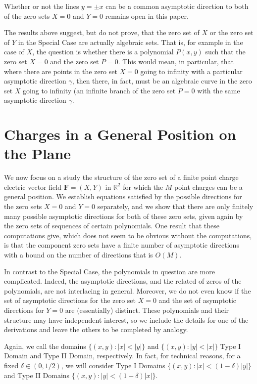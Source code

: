 \documentclass{article}
\theoremstyle{remark}
\numberwithin{equation}{section}
\begin{document}
Whether or not the lines $y = \pm x$ can be a common asymptotic direction to both of the zero sets 
$X=0$ and $Y=0$ remains open in this paper.   

The results above suggest, but do not prove, that the zero set of $X$ or the zero set of $Y$ in the Special Case are actually algebraic sets. That is, for example in the case of $X$, 
the question is whether there is a polynomial $P(x,y)$ such that the zero set $X=0$ and the zero set $P=0$.  This would mean, in particular, that where there are points in 
the zero set $X=0$ going to infinity with a particular asymptotic direction $\gamma$, then there, in fact, must be an algebraic curve in the zero set $X$ going to infinity 
(an infinite branch of the zero set $P=0$ with the same asymptotic direction $\gamma$.

\section{Charges in a General Position on the Plane}\label{GENERAL}

We now focus on a study the structure of the zero set of a finite point charge electric vector field ${\mathbf F}=(X,Y)$ in 
${\mathbb R}^2$ for which the $M$ point charges can be a general position.  We establish equations satisfied by the possible directions for the zero sets $X=0$ and $Y=0$ 
separately, and we show that there are only finitely many possible asymptotic directions for both of these 
zero sets, given again by the zero sets of sequences of certain polynomials.  
One result that these computations give, which does not seem to be obvious without the computations, is that the component zero sets have a finite number of asymptotic directions with a bound on the number of directions that is $O(M)$. 

In contrast to the Special Case, the polynomials in question are more complicated.  Indeed, the asymptotic directions, and the related of zeros of the polynomials, are not interlacing in general.  
Moreover, we do not even know if the set of asymptotic directions for the zero set $X=0$ and the set of asymptotic directions for $Y=0$ are (essentially) distinct.  These polynomials 
and their structure may have independent interest, so we include the details for one of the derivations and leave the others to be completed by analogy.  

Again, we call the domains $\{(x,y):|x| < |y|\}$ and $\{(x,y):|y| < |x|\}$ Type I Domain and Type II Domain, respectively.
In fact, for technical reasons, for a fixed $\delta \in (0,1/2)$, we will consider Type I Domains
$\{(x,y):|x| < (1-\delta)|y|\}$ and Type II Domains $\{(x,y):|y| < (1-\delta)|x|\}$.  
\end{document}
